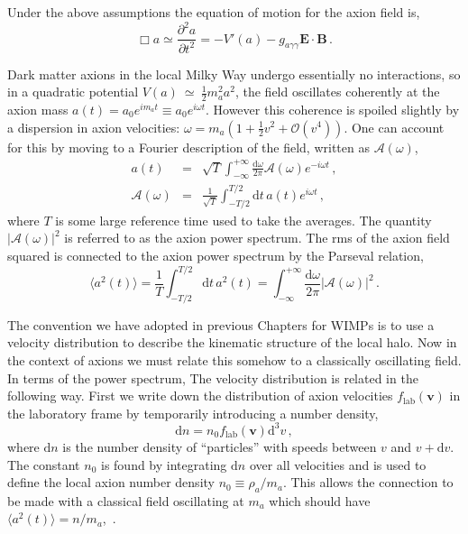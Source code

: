 Under the above assumptions the equation of motion for the axion field is,
\begin{equation}
 \Box a \simeq \frac{\partial^2 a}{\partial t^2}= -V'(a) - g_{a\gamma\gamma}\textbf{E}\cdot\textbf{B} \, .
\end{equation}

Dark matter axions in the local Milky Way undergo essentially no interactions, so in a quadratic potential $V(a)~\simeq~\frac{1}{2} m_a^2 a^2$, the field oscillates coherently at the axion mass $a(t) = a_0 e^{im_a t} \equiv a_0 e^{i\omega t}$. However this coherence is spoiled slightly by a dispersion in axion velocities: $ \omega = m_a(1+\frac{1}{2}v^2 + \mathcal{O}(v^4))$. One can account for this by moving to a Fourier description of the field, written as $\mathcal{A}(\omega)$,
\begin{eqnarray}
 a(t) &=& \sqrt{T} \int_{-\infty}^{+\infty} \frac{\textrm{d}\omega}{2\pi} \mathcal{A}(\omega) e^{-i\omega t} \,, \\
 \mathcal{A}(\omega) &=& \frac{1}{\sqrt{T}} \int_{-T/2}^{T/2} \textrm{d}t \,  a(t) e^{i\omega t} \, ,
\end{eqnarray}
where $T$ is some large reference time used to take the averages. The quantity $|\mathcal{A}(\omega)|^2$ is referred to as the axion power spectrum. The rms of the axion field squared is connected to the axion power spectrum by the Parseval relation,
\begin{equation}\label{eq:parseval}
 \langle a^2(t) \rangle = \frac{1}{T} \int_{-T/2}^{T/2} \textrm{d} t\, a^2(t) = \int_{-\infty}^{+\infty} \frac{\textrm{d}\omega}{2\pi} |\mathcal{A}(\omega)|^2 \, .
\end{equation} 

The convention we have adopted in previous Chapters for WIMPs is to use a velocity distribution to describe the kinematic structure of the local halo. Now in the context of axions we must relate this somehow to a classically oscillating field. In terms of the power spectrum, The velocity distribution is related in the following way. First we write down the distribution of axion velocities $f_\textrm{lab}(\textbf{v})$ in the laboratory frame by temporarily introducing a number density,
\begin{equation}
 \textrm{d}n = n_0 f_\textrm{lab}(\textbf{v}) \textrm{d}^3 v \, ,
\end{equation}
where $\textrm{d}n$ is the number density of ``particles'' with speeds between $v$ and $v + \textrm{d}v$. The constant $n_0$ is found by integrating $\textrm{d}n$ over all velocities and is used to define the local axion number density $n_0 \equiv \rho_a/m_a$. This allows the connection to be made with a classical field oscillating at $m_a$ which should have $\langle a^2(t)\rangle = n /m_a $,~\cite{Krauss:1985ub}.

